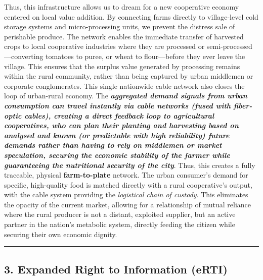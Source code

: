 Thus, this infrastructure allows us to dream for a new cooperative
economy centered on local value addition. By connecting farms directly
to village-level cold storage systems and micro-processing units, we
prevent the distress sale of perishable produce. The network enables the
immediate transfer of harvested crops to local cooperative industries
where they are processed or semi-processed---converting tomatoes to
puree, or wheat to flour---before they ever leave the village. This
ensures that the surplus value generated by processing remains within
the rural community, rather than being captured by urban middlemen or
corporate conglomerates. This single nationwide cable network also
closes the loop of urban-rural economy. The \textbf{\emph{aggregated
demand signals from urban consumption can travel instantly via cable
networks (fused with fiber-optic cables), creating a direct feedback
loop to agricultural cooperatives, who can plan their planting and
harvesting based on analysed and known (or predictable with high
reliability) future demands rather than having to rely on middlemen or
market speculation, securing the economic stability of the farmer while
guaranteeing the nutritional security of the city}}. Thus, this creates
a fully traceable, physical \textbf{farm-to-plate} network. The urban
consumer's demand for specific, high-quality food is matched directly
with a rural cooperative's output, with the cable system providing the
\emph{logistical chain of custody}. This eliminates the opacity of the
current market, allowing for a relationship of mutual reliance where the
rural producer is not a distant, exploited supplier, but an active
partner in the nation's metabolic system, directly feeding the citizen
while securing their own economic dignity.

\begin{center}\rule{0.5\linewidth}{0.5pt}\end{center}

\subsection{3. Expanded Right to Information
(eRTI)}\label{expanded-right-to-information-erti}

